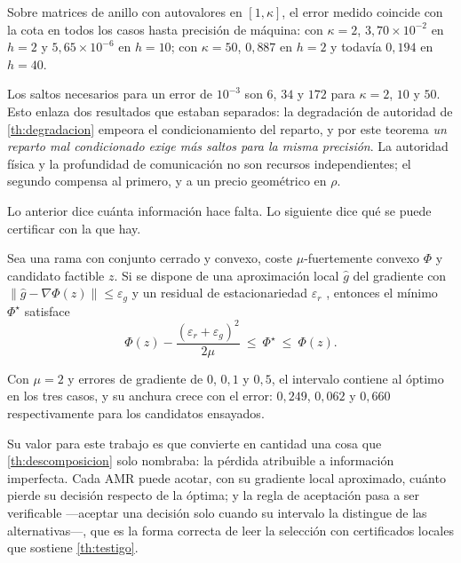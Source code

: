 \begin{observacion}
\label{obs:saltos-num}
Sobre matrices de anillo con autovalores en $[1,\kappa]$, el error medido
coincide con la cota en todos los casos hasta precisión de máquina: con
$\kappa=2$, $3{,}70\times10^{-2}$ en $h=2$ y $5{,}65\times10^{-6}$ en $h=10$;
con $\kappa=50$, $0{,}887$ en $h=2$ y todavía $0{,}194$ en $h=40$.

Los saltos necesarios para un error de $10^{-3}$ son $6$, $34$ y $172$ para
$\kappa=2$, $10$ y $50$. Esto enlaza dos resultados que estaban separados: la
degradación de autoridad de \cref{th:degradacion} empeora el condicionamiento
del reparto, y por este teorema \emph{un reparto mal condicionado exige más
saltos para la misma precisión}. La autoridad física y la profundidad de
comunicación no son recursos independientes; el segundo compensa al primero, y
a un precio geométrico en $\rho$.
\end{observacion}

Lo anterior dice cuánta información hace falta. Lo siguiente dice qué se puede
certificar con la que hay.

\begin{teorema}
\label{th:intervalo}
Sea una rama con conjunto cerrado y convexo, coste $\mu$-fuertemente convexo
$\Phi$ y candidato factible $z$. Si se dispone de una aproximación local
$\hat g$ del gradiente con $\lVert\hat g-\nabla\Phi(z)\rVert\le\varepsilon_g$ y
un residual de estacionariedad $\varepsilon_r$ \cite{mayorga2026m1}, entonces el mínimo $\Phi^\star$
satisface
\[
  \Phi(z)-\frac{(\varepsilon_r+\varepsilon_g)^{2}}{2\mu}\ \le\ \Phi^\star\ \le\ \Phi(z).
\]
\end{teorema}

\begin{observacion}
\label{obs:intervalo-num}
Con $\mu=2$ y errores de gradiente de $0$, $0{,}1$ y $0{,}5$, el intervalo
contiene al óptimo en los tres casos, y su anchura crece con el error:
$0{,}249$, $0{,}062$ y $0{,}660$ respectivamente para los candidatos ensayados.

Su valor para este trabajo es que convierte en cantidad una cosa que
\cref{th:descomposicion} solo nombraba: la pérdida atribuible a información
imperfecta. Cada AMR puede acotar, con su gradiente local aproximado, cuánto
pierde su decisión respecto de la óptima; y la regla de aceptación pasa a ser
verificable —aceptar una decisión solo cuando su intervalo la distingue de las
alternativas—, que es la forma correcta de leer la selección con certificados
locales que sostiene \cref{th:testigo}.
\end{observacion}

